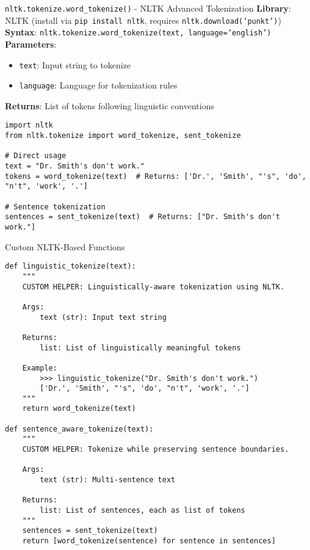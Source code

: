 \documentclass[11pt,a4paper]{article}
\begin{document}
\begin{nativebox}{\texttt{nltk.tokenize.word\_tokenize()} - NLTK Advanced Tokenization}
\textbf{Library}: NLTK (install via \texttt{pip install nltk}, requires \texttt{nltk.download('punkt')}) \\
\textbf{Syntax}: \texttt{nltk.tokenize.word\_tokenize(text, language='english')} \\
\textbf{Parameters}:
\begin{itemize}
\item \texttt{text}: Input string to tokenize
\item \texttt{language}: Language for tokenization rules
\end{itemize}

\textbf{Returns}: List of tokens following linguistic conventions

\begin{lstlisting}[caption=NLTK tokenization examples]
import nltk
from nltk.tokenize import word_tokenize, sent_tokenize

# Direct usage
text = "Dr. Smith's don't work."
tokens = word_tokenize(text)  # Returns: ['Dr.', 'Smith', "'s", 'do', "n't", 'work', '.']

# Sentence tokenization
sentences = sent_tokenize(text)  # Returns: ["Dr. Smith's don't work."]
\end{lstlisting}
\end{nativebox}

\begin{custombox}{Custom NLTK-Based Functions}

\begin{lstlisting}[caption=Custom NLTK wrapper functions]
def linguistic_tokenize(text):
    """
    CUSTOM HELPER: Linguistically-aware tokenization using NLTK.
    
    Args:
        text (str): Input text string
        
    Returns:
        list: List of linguistically meaningful tokens
        
    Example:
        >>> linguistic_tokenize("Dr. Smith's don't work.")
        ['Dr.', 'Smith', "'s", 'do', "n't", 'work', '.']
    """
    return word_tokenize(text)

def sentence_aware_tokenize(text):
    """
    CUSTOM HELPER: Tokenize while preserving sentence boundaries.
    
    Args:
        text (str): Multi-sentence text
        
    Returns:
        list: List of sentences, each as list of tokens
    """
    sentences = sent_tokenize(text)
    return [word_tokenize(sentence) for sentence in sentences]
\end{lstlisting}
\end{custombox}
\end{document}
